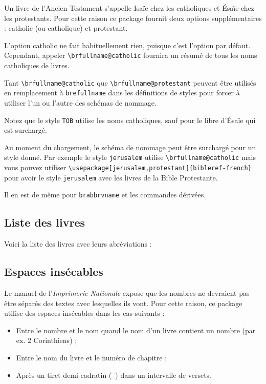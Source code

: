 \documentclass{ltxdoc}
\begin{document}
Un livre de l'Ancien Testament s'appelle Isaïe chez les catholiques et Ésaïe chez les protestants.
Pour cette raison ce package fournit deux options supplémentaires :  \textsf{catholic} (ou \textsf{catholique}) et \textsf{protestant}.

L'option \textsf{catholic} ne fait habituellement rien, puisque c'est l'option par défaut. Cependant, appeler  \verb!\brfullname@catholic! fournira un résumé de tous les noms catholiques de livres.

Tant \verb|\brfullname@catholic| que \verb|\brfullname@protestant| peuvent être utilisés en remplacement à  \verb|brefullname| dans les définitions de styles pour forcer à utiliser l'un ou l'autre des schémas de nommage.

Notez que le style \verb|TOB| utilise les noms catholiques, sauf pour le libre d'Ésaïe qui est surchargé.

Au moment du chargement, le schéma de nommage peut être surchargé pour un style donné. Par exemple le style \verb|jerusalem| utilise \verb|\brfullname@catholic| mais vous pouvez utiliser \verb|\usepackage[jerusalem,protestant]{bibleref-french}| pour avoir le style \verb|jerusalem| avec les livres de la Bible Protestante.

Il en est de même pour \verb|brabbrvname| et les commandes dérivées.

\subsection{Liste des livres}

\def\abreviation{Abréviation}
\def\livre{Livre}
Voici la liste des livres avec leurs abréviations :



\subsection{Espaces insécables}

Le manuel de l'\emph{Imprimerie Nationale} expose que les nombres ne devraient pas être séparés des textes avec lesquelles ils vont. Pour cette raison, ce package utilise des espaces insécables dans les cas suivants :
\begin{itemize}
\item Entre le nombre et le nom quand le nom d'un livre contient un nombre (par ex. 2 Corinthiens) ;
\item Entre le nom du livre et le numéro de chapitre ;
\item Après un tiret demi-cadratin (--) dans un intervalle de versets.

\end{itemize}
\end{document}
